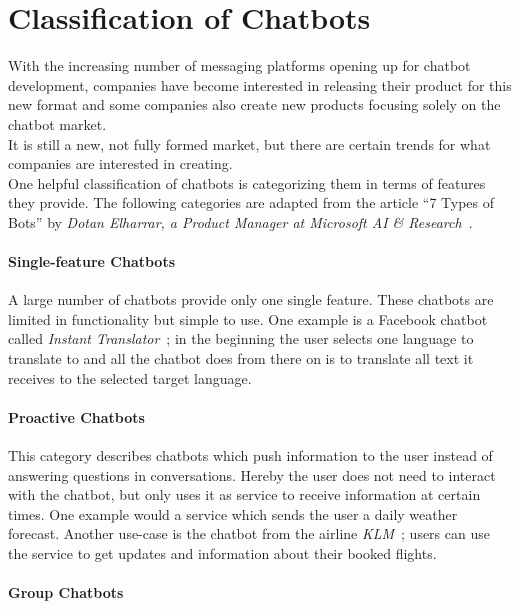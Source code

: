 \section{Classification of Chatbots}
\label{classification}


With the increasing number of messaging platforms opening up for chatbot development,
companies have become interested in releasing their product for this new format and some companies also create new products focusing solely on the chatbot market.
\\

It is still a new, not fully formed market, but there are certain trends for what companies are interested in creating.
\\

One helpful classification of chatbots is categorizing them in terms of features they provide.
The following categories are adapted from the article ``7 Types of Bots'' by \emph{Dotan Elharrar, a Product Manager at Microsoft AI \& Research}~\cite{bottypes}.


\paragraph{Single-feature Chatbots}

A large number of chatbots provide only one single feature.
These chatbots are limited in functionality but simple to use.
One example is a Facebook chatbot called \emph{Instant Translator}~\cite{instanttranslator};
in the beginning the user selects one language to translate to and all the chatbot does from there on is to translate all text it receives to the selected target language.


\paragraph{Proactive Chatbots}

This category describes chatbots which push information to the user instead of answering questions in conversations.
Hereby the user does not need to interact with the chatbot, but only uses it as service to receive information at certain times.
One example would a service which sends the user a daily weather forecast.
Another use-case is the chatbot from the airline \emph{KLM}~\cite{klm}; users can use the service to get updates and information about their booked flights.


\paragraph{Group Chatbots}

